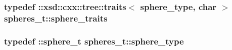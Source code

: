 \hypertarget{classspheres__t_aa9e5c761af0e467b7de444613c67d826}{
\subsubsection[{sphere\-\_\-traits}]{\setlength{\rightskip}{0pt plus 5cm}typedef \-::xsd\-::cxx\-::tree\-::traits$<$ {\bf sphere\-\_\-type}, char $>$ {\bf spheres\-\_\-t\-::sphere\-\_\-traits}}}\label{classspheres__t_aa9e5c761af0e467b7de444613c67d826}
\hypertarget{classspheres__t_a206f1776b61d2342bf0bd21629d2a690}{
\subsubsection[{sphere\-\_\-type}]{\setlength{\rightskip}{0pt plus 5cm}typedef \-::{\bf sphere\-\_\-t} {\bf spheres\-\_\-t\-::sphere\-\_\-type}}}\label{classspheres__t_a206f1776b61d2342bf0bd21629d2a690}


